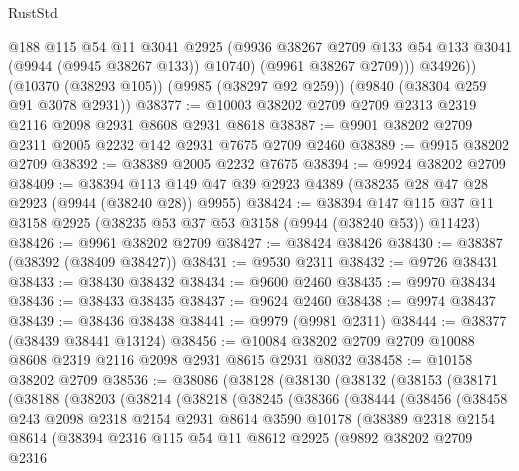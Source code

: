 \begin{lexlean}{RustStd}
\begin{coremodule}
            @188
            @115
            @54
            @11
            @3041
            @2925
            (@9936 @38267 @2709 @133 @54 @133 @3041 (@9944 (@9945 @38267 @133)) @10740)
            (@9961 @38267 @2709)))
        @34926))
    (@10370 (@38293 @105))
    (@9985 (@38297 @92 @259))
    (@9840 (@38304 @259 @91 @3078 @2931))
@38377 := @10003 @38202 @2709 @2709 @2313 @2319 @2116 @2098 @2931 @8608 @2931 @8618
@38387 := @9901 @38202 @2709 @2311 @2005 @2232 @142 @2931 @7675 @2709 @2460
@38389 := @9915 @38202 @2709
@38392 := @38389 @2005 @2232 @7675
@38394 := @9924 @38202 @2709
@38409 := @38394 @113 @149 @47 @39 @2923 @4389 (@38235 @28 @47 @28 @2923 (@9944 (@38240 @28)) @9955)
@38424 := @38394
    @147
    @115
    @37
    @11
    @3158
    @2925
    (@38235 @53 @37 @53 @3158 (@9944 (@38240 @53)) @11423)
@38426 := @9961 @38202 @2709
@38427 := @38424 @38426
@38430 := @38387 (@38392 (@38409 @38427))
@38431 := @9530 @2311
@38432 := @9726 @38431
@38433 := @38430 @38432
@38434 := @9600 @2460
@38435 := @9970 @38434
@38436 := @38433 @38435
@38437 := @9624 @2460
@38438 := @9974 @38437
@38439 := @38436 @38438
@38441 := @9979 (@9981 @2311)
@38444 := @38377 (@38439 @38441 @13124)
@38456 := @10084 @38202 @2709 @2709 @10088 @8608 @2319 @2116 @2098 @2931 @8615 @2931 @8032
@38458 := @10158 @38202 @2709
@38536 := @38086
    (@38128
      (@38130
        (@38132
          (@38153
            (@38171
              (@38188
                (@38203
                  (@38214
                    (@38218
                      (@38245
                        (@38366
                          (@38444
                            (@38456
                              (@38458
                                @243
                                @2098
                                @2318
                                @2154
                                @2931
                                @8614
                                @3590
                                @10178
                                (@38389
                                  @2318
                                  @2154
                                  @8614
                                  (@38394
                                    @2316
                                    @115
                                    @54
                                    @11
                                    @8612
                                    @2925
                                    (@9892
                                      @38202
                                      @2709
                                      @2316

\end{coremodule}
\end{lexlean}
